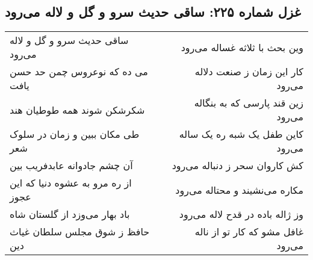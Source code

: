 \begin{center}
\section*{غزل شماره ۲۲۵: ساقی حدیث سرو و گل و لاله می‌رود}
\label{sec:sh225}
\begin{longtable}{l p{0.5cm} r}
ساقی حدیث سرو و گل و لاله می‌رود
&&
وین بحث با ثلاثه غساله می‌رود
\\
می ده که نوعروس چمن حد حسن یافت
&&
کار این زمان ز صنعت دلاله می‌رود
\\
شکرشکن شوند همه طوطیان هند
&&
زین قند پارسی که به بنگاله می‌رود
\\
طی مکان ببین و زمان در سلوک شعر
&&
کاین طفل یک شبه ره یک ساله می‌رود
\\
آن چشم جادوانه عابدفریب بین
&&
کش کاروان سحر ز دنباله می‌رود
\\
از ره مرو به عشوه دنیا که این عجوز
&&
مکاره می‌نشیند و محتاله می‌رود
\\
باد بهار می‌وزد از گلستان شاه
&&
وز ژاله باده در قدح لاله می‌رود
\\
حافظ ز شوق مجلس سلطان غیاث دین
&&
غافل مشو که کار تو از ناله می‌رود
\\
\end{longtable}
\end{center}
